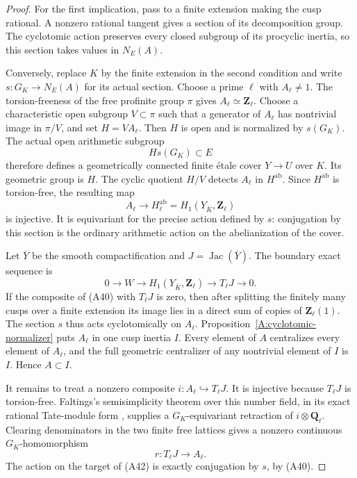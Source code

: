 \begin{proof}
For the first implication, pass to a finite extension
making the cusp rational. A nonzero rational tangent
gives a section of its decomposition group. The
cyclotomic action preserves every closed subgroup
of its procyclic inertia, so this section takes
values in $N_E(A)$.

Conversely, replace $K$ by the finite extension
in the second condition and write
$s:G_K\to N_E(A)$ for its actual section.
Choose a prime $\ell$ with $A_\ell\ne1$.
The torsion-freeness of the free profinite group
$\pi$ gives $A_\ell\simeq\mathbf Z_\ell$.
Choose a characteristic open subgroup $V\subset\pi$
such that a generator of $A_\ell$ has nontrivial
image in $\pi/V$, and set $H=V A_\ell$.
Then $H$ is open and is normalized by $s(G_K)$.
The actual open arithmetic subgroup
\[
                         Hs(G_K)\subset E
\]
therefore defines a geometrically connected finite
\'etale cover $Y\to U$ over $K$. Its geometric
group is $H$. The cyclic quotient $H/V$ detects
$A_\ell$ in $H^{\mathrm{ab}}$.
Since $H^{\mathrm{ab}}$ is torsion-free, the resulting
map
\[
 A_\ell\longrightarrow H^{\mathrm{ab}}_{\ell}
       =H_1(Y_{\overline K},\mathbf Z_\ell)
                                                        \tag{A40}
\]
is injective. It is equivariant for the precise
action defined by $s$: conjugation by this section
is the ordinary arithmetic action on the
abelianization of the cover.

Let $\overline Y$ be the smooth compactification
and $J=\operatorname{Jac}(\overline Y)$. The
boundary exact sequence is
\[
 0\longrightarrow W\longrightarrow H_1(Y_{\overline K},\mathbf Z_\ell)
       \longrightarrow T_\ell J\longrightarrow0.
                                                        \tag{A41}
\]
If the composite of (A40) with $T_\ell J$ is zero,
then after splitting the finitely many cusps over
a finite extension its image lies in a direct
sum of copies of $\mathbf Z_\ell(1)$. The section
$s$ thus acts cyclotomically on $A_\ell$.
Proposition~\ref{A:cyclotomic-normalizer} puts
$A_\ell$ in one cusp inertia $I$.
Every element of $A$ centralizes every element
of $A_\ell$, and the full geometric centralizer
of any nontrivial element of $I$ is $I$.
Hence $A\subset I$.

It remains to treat a nonzero composite
$i:A_\ell\hookrightarrow T_\ell J$.
It is injective because $T_\ell J$ is torsion-free.
Faltings's semisimplicity theorem over this number
field, in its exact rational Tate-module form
\cite[\S5, Satz 3]{Faltings1983}, supplies a
$G_K$-equivariant retraction of
$i\otimes\mathbf Q_\ell$. Clearing denominators
in the two finite free lattices gives a nonzero
continuous $G_K$-homomorphism
\[
                 r:T_\ell J\longrightarrow A_\ell.
                                                        \tag{A42}
\]
The action on the target of (A42) is exactly
conjugation by $s$, by (A40).


\end{proof}
